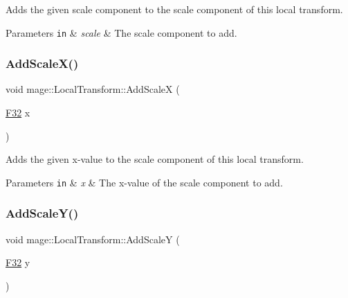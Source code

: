 Adds the given scale component to the scale component of this local transform.


\begin{DoxyParams}[1]{Parameters}
\mbox{\tt in}  & {\em scale} & The scale component to add. \\
\hline
\end{DoxyParams}
\hypertarget{classmage_1_1_local_transform_a5b3bdbe95a1b531271a122d1fe26f0a6}{}\label{classmage_1_1_local_transform_a5b3bdbe95a1b531271a122d1fe26f0a6} 
\subsubsection{\texorpdfstring{Add\+Scale\+X()}{AddScaleX()}}
{\footnotesize\ttfamily void mage\+::\+Local\+Transform\+::\+Add\+ScaleX (\begin{DoxyParamCaption}\item[{\hyperlink{namespacemage_aa97e833b45f06d60a0a9c4fc22ae02c0}{F32}}]{x }\end{DoxyParamCaption})\hspace{0.3cm}{\ttfamily [noexcept]}}

Adds the given x-\/value to the scale component of this local transform.


\begin{DoxyParams}[1]{Parameters}
\mbox{\tt in}  & {\em x} & The x-\/value of the scale component to add. \\
\hline
\end{DoxyParams}
\hypertarget{classmage_1_1_local_transform_abd8826a904947b5934ba6afef3b3826f}{}\label{classmage_1_1_local_transform_abd8826a904947b5934ba6afef3b3826f} 
\subsubsection{\texorpdfstring{Add\+Scale\+Y()}{AddScaleY()}}
{\footnotesize\ttfamily void mage\+::\+Local\+Transform\+::\+Add\+ScaleY (\begin{DoxyParamCaption}\item[{\hyperlink{namespacemage_aa97e833b45f06d60a0a9c4fc22ae02c0}{F32}}]{y }\end{DoxyParamCaption})\hspace{0.3cm}{\ttfamily [noexcept]}}

